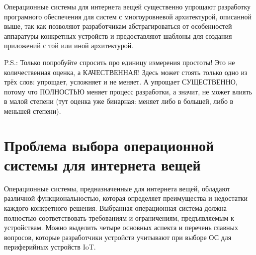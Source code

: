 Операционные системы для интернета вещей существенно упрощают разработку програмного обеспечения для систем с многоуровневой архитектурой, описанной выше, так как позволяют разработчикам абстрагироваться от особенностей аппаратуры конкретных устройств и предоставляют шаблоны для создания приложений с той или иной архитектурой.

P.S.: Только попробуйте спросить про единицу измерения простоты! Это не количественная оценка, а КАЧЕСТВЕННАЯ! Здесь может стоять только одно из трёх слов: упрощает, усложняет и не меняет. А упрощает СУЩЕСТВЕННО, потому что ПОЛНОСТЬЮ меняет процесс разработки, а значит, не может влиять в малой степени (тут оценка уже бинарная: меняет либо в большей, либо в меньшей степени).








\section{Проблема выбора операционной системы для интернета вещей}

Операционные системы, предназначенные для интернета вещей, обладают различной функциональностью, которая определяет преимущества и недостатки каждого конкретного решения. Выбранная операционная система должна полностью соответствовать требованиям и ограничениям, предъявляемым к устройствам. Можно выделить четыре основных аспекта и перечень главных вопросов, которые разработчики устройств учитывают при выборе ОС для периферийных устройств IoT. \cite{OS_questions}

